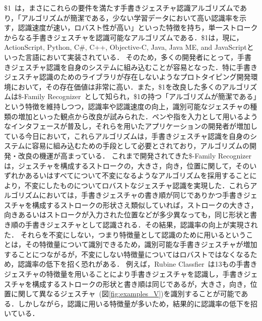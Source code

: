 \$1~\cite{Wobbrock:2007:GWL:1294211.1294238}は，まさにこれらの要件を満たす手書きジェスチャ認識アルゴリズムであり，「アルゴリズムが簡潔である，少ない学習データにおいて高い認識率を示す，認識速度が速い，ロバスト性が高い」といった特徴を持ち，単一ストロークからなる手書きジェスチャを認識可能なアルゴリズムである．\$1は，現に，ActionScript, Python, C\#, C++, Objective-C, Java, Java ME, and JavaScriptといった言語において実装されている．
そのため，多くの開発者にとって，手書きジェスチャ認識を自身のシステムに組み込むことが容易となった．特に手書きジェスチャ認識のためのライブラリが存在しないようなプロトタイピング開発環境において，その存在価値は非常に高い．また，\$1を改良した多くのアルゴリズムは\$-Family Recognizer~\cite{Anthony:2010:LMR:1839214.1839258,Reaver:2011:MQU:2021164.2021183,Li:2010:PFA:1753326.1753654,Anthony:2012:NFA:2305276.2305296,Herold:2012:CRF:2331067.2331074,Vatavu:2012:GPC:2388676.2388732,Taranta:2015:PPB:2788890.2788925,Pittman:2016:FFA:2856767.2856808,Vatavu:2012:OAF:2166966.2167022,}として知られ，\$1の持つ「アルゴリズムが簡潔である」という特徴を維持しつつ，認識率や認識速度の向上，識別可能なジェスチャの種類の増加といった観点から改良が試みられた．ペンや指を入力として用いるようなインタフェースが普及し，それらを用いたアプリケーションの開発者が増加している今日において，これらアルゴリズムは，手書きジェスチャ認識を自身のシステムに容易に組み込むための手段として必要とされており，アルゴリズムの開発・改良の機運が高まっている．
これまで開発されてきた\$-Family Recognizerは，ジェスチャを構成するストロークの，大きさ，向き，位置に関して，そのいずれかあるいはすべてについて不変になるようなアルゴリズムを採用することにより，不変にしたものについてロバストなジェスチャ認識を実現した．これらアルゴリズムにおいては，手書きジェスチャの書き順が同じでありかつ手書きジェスチャを構成するストロークの形状さえ類似していれば，ストロークの大きさ，向きあるいはストロークが入力された位置などが多少異なっても，同じ形状と書き順の手書きジェスチャとして認識される．その結果，認識率の向上が実現された．
それらを不変にしない，つまり特徴量として認識のために用いるということは，その特徴量について識別できるため，識別可能な手書きジェスチャが増加することにつながるが，不変にしない特徴量についてはロバストではなくなるため，認識率の低下を招く恐れがある．
例えば，Rubine Classfier~\cite{Rubine:1991:SGE:122718.122753}は13もの手書きジェスチャの特徴量を用いることにより手書きジェスチャを認識し，手書きジェスチャを構成するストロークの形状と書き順は同じであるが，大きさ，向き，位置に関して異なるジェスチャ~(図\ref{fig:examples_V})を識別することが可能である．しかしながら，認識に用いる特徴量が多いため，結果的に認識率の低下を招いている．

